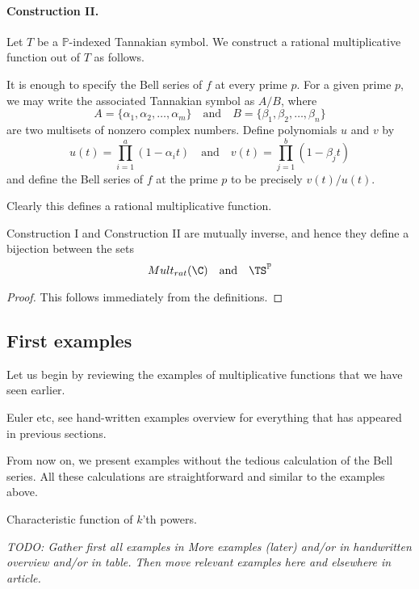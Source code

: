 \documentclass[a4paper]{article}
\begin{document}
\paragraph{Construction II.} Let $T$ be a $\mathbb{P}$-indexed Tannakian symbol. We construct a rational multiplicative function out of $T$ as follows.

It is enough to specify the Bell series of $f$ at every prime $p$. For a given prime $p$, we may write the associated Tannakian symbol as $A/B$, where 
$$ A = \{ \alpha_1, \alpha_2, \ldots, \alpha_m \} \quad \mathrm{and} \quad B =  \{ \beta_1, \beta_2, \ldots, \beta_n \}$$
are two multisets of nonzero complex numbers. Define polynomials $u$ and $v$ by 
$$ u(t) = \prod_{i=1}^a (1-{\alpha_i}t) \quad \mathrm{and} \quad v(t) = \prod_{j=1}^b (1-{\beta_j}t)$$
and define the Bell series of $f$ at the prime $p$ to be precisely $v(t) / u(t)$. 

Clearly this defines a rational multiplicative function.


\begin{theorem}
Construction I and Construction II are mutually inverse, and hence they define a bijection between the sets
$$   Mult_{rat}(\C) \quad \textrm{and}  \quad  \TS^{\mathbb{P}} $$
\end{theorem}
\begin{proof}
This follows immediately from the definitions.
\end{proof}

\subsection{First examples}

Let us begin by reviewing the examples of multiplicative functions that we have seen earlier.

\begin{example}
Euler etc, see hand-written examples overview for everything that has appeared in previous sections.
\end{example}

From now on, we present examples without the tedious calculation of the Bell series. All these calculations are straightforward and similar to the examples above.

\begin{example}
Characteristic function of $k$'th powers.
\end{example}


\emph{TODO: Gather first all examples in More examples (later) and/or in handwritten overview and/or in table. Then move relevant examples here and elsewhere in article.}
\end{document}
